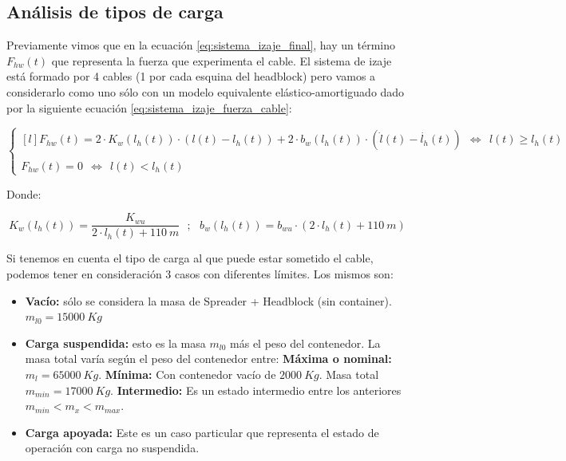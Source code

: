 \documentclass[11pt]{article}
\begin{document}
\newpage

\subsection{Análisis de tipos de carga}
\label{section:carga}

Previamente vimos que en la ecuación \ref{eq:sistema_izaje_final}, hay un término $F_{hw}(t)$ que representa la fuerza que experimenta el cable. El sistema de izaje está formado por 4 cables (1 por cada esquina del headblock) pero vamos a considerarlo como uno sólo con un modelo equivalente elástico-amortiguado dado por la siguiente ecuación \ref{eq:sistema_izaje_fuerza_cable}:

\begin{equation}
	\label{eq:sistema_izaje_fuerza_cable}
	\left\{
		\begin{matrix*}[l]
		F_{hw}(t)=2\cdot K_{w}\left ( l_{h}(t) \right )\cdot \left ( l(t)-l_{h}(t) \right )+2\cdot b_{w}\left ( l_{h}(t) \right )\cdot ( \dot{l}(t)-\dot{l_{h}}(t) ) \ \ \Leftrightarrow\ \ l(t)\geq l_{h}(t)
		\\
		\\ 
		F_{hw}(t)= 0\ \ \Leftrightarrow\ \ l(t)<l_{h}(t)
		\end{matrix*}
	\right.
\end{equation}

Donde:

\begin{equation}
	\label{eq:sistema_izaje_fuerza_cable_params}
	K_{w}\left ( l_{h}(t) \right )=\frac{K_{wu}}{2\cdot l_{h}(t)+110\ m}\ \ \ ;\ \ \ b_{w}\left ( l_{h}(t) \right )=b_{wu}\cdot \left ( 2\cdot l_{h}(t)+110\ m \right )
\end{equation}

Si tenemos en cuenta el tipo de carga al que puede estar sometido el cable, podemos tener en consideración 3 casos con diferentes límites. Los mismos son:

\begin{itemize}
	\item \textbf{Vacío:} sólo se considera la masa de Spreader + Headblock (sin container). $m_{l0}=15000\ Kg$
	\item \textbf{Carga suspendida:} esto es la masa $m_{l0}$ más el peso del contenedor. La masa total varía según el peso del contenedor entre:
		\subitem \textbf{Máxima o nominal:} $m_{l}=65000\ Kg$.
		\subitem \textbf{Mínima:} Con contenedor vacío de $2000\ Kg$. Masa total $m_{min}=17000\ Kg$.
		\subitem \textbf{Intermedio:} Es un estado intermedio entre los anteriores $m_{min}<m_{x}<m_{max}$.
	\item \textbf{Carga apoyada:} Este es un caso particular que representa el estado de operación con carga no suspendida.
	
\end{itemize}
\end{document}
